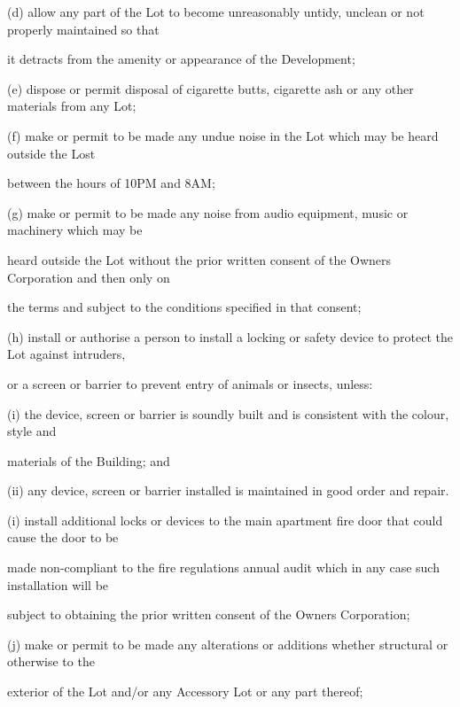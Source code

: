 \documentclass{article}
\begin{document}
{\fontsize{9.962}{1}(d) allow any part of the Lot to become unreasonably untidy, unclean or not properly maintained so that }

{\fontsize{10.02}{1}it detracts from the amenity or appearance of the Development; }

{\fontsize{9.962}{1}(e) dispose or permit disposal of cigarette butts, cigarette ash or any other materials from any Lot; }

{\fontsize{9.962}{1}(f) make or permit to be made any undue noise in the Lot which may be heard outside the Lost }

{\fontsize{10.02}{1}between the hours of 10PM and 8AM; }

{\fontsize{9.962}{1}(g) make or permit to be made any noise from audio equipment, music or machinery which may be }

{\fontsize{10.02}{1}heard outside the Lot without the prior written consent of the Owners Corporation and then only on }

{\fontsize{10.02}{1}the terms and subject to the conditions specified in that consent; }

{\fontsize{9.962}{1}(h) install or authorise a person to install a locking or safety device to protect the Lot against intruders, }

{\fontsize{10.02}{1}or a screen or barrier to prevent entry of animals or insects, unless: }

{\fontsize{9.962}{1}(i) the device, screen or barrier is soundly built and is consistent with the colour, style and }

{\fontsize{10.02}{1}materials of the Building; and }

{\fontsize{10.02}{1}(ii) any device, screen or barrier installed is maintained in good order and repair. }

{\fontsize{9.962}{1}(i) install additional locks or devices to the main apartment fire door that could cause the door to be }

{\fontsize{10.02}{1}made non-compliant to the fire regulations annual audit which in any case such installation will be }

{\fontsize{10.02}{1}subject to obtaining the prior written consent of the Owners Corporation; }

{\fontsize{9.962}{1}(j) make or permit to be made any alterations or additions whether structural or otherwise to the }

{\fontsize{10.02}{1}exterior of the Lot and/or any Accessory Lot or any part thereof; }
\end{document}
